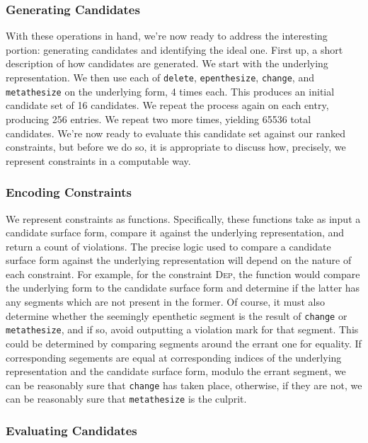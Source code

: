 \documentclass[12pt]{article}
\begin{document}
\subsubsection{Generating Candidates}

With these operations in hand, we're now ready to address the interesting
portion: generating candidates and identifying the ideal one. First up, a short
description of how candidates are generated. We start with the underlying
representation. We then use each of \texttt{delete}, \texttt{epenthesize},
\texttt{change}, and \texttt{metathesize} on the underlying form, 4 times each.
This produces an initial candidate set of 16 candidates. We repeat the process
again on each entry, producing 256 entries. We repeat two more times, yielding
65536 total candidates. We're now ready to evaluate this candidate set against
our ranked constraints, but before we do so, it is appropriate to discuss how,
precisely, we represent constraints in a computable way.

\subsubsection{Encoding Constraints}

We represent constraints as functions. Specifically, these functions take as
input a candidate surface form, compare it against the underlying
representation, and return a count of violations. The precise logic used to
compare a candidate surface form against the underlying representation will
depend on the nature of each constraint. For example, for the constraint
\textsc{Dep}, the function would compare the underlying form to the candidate
surface form and determine if the latter has any segments which are not present
in the former. Of course, it must also determine whether the seemingly
epenthetic segment is the result of \texttt{change} or \texttt{metathesize},
and if so, avoid outputting a violation mark for that segment. This could be
determined by comparing segments around the errant one for equality. If
corresponding segements are equal at corresponding indices of the underlying
representation and the candidate surface form, modulo the errant segment, we
can be reasonably sure that \texttt{change} has taken place, otherwise, if
they are not, we can be reasonably sure that \texttt{metathesize} is the
culprit.

\subsubsection{Evaluating Candidates}
\end{document}
